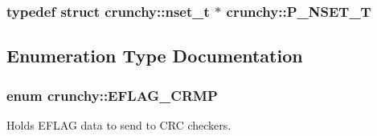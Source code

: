\subsubsection[{P\+\_\+\+N\+S\+E\+T\+\_\+T}]{\setlength{\rightskip}{0pt plus 5cm}typedef struct {\bf crunchy\+::nset\+\_\+t} $\ast$ {\bf crunchy\+::\+P\+\_\+\+N\+S\+E\+T\+\_\+T}}\hypertarget{namespacecrunchy_ab958409ccb75be47eba557824d83fb0e}{}\label{namespacecrunchy_ab958409ccb75be47eba557824d83fb0e}


\subsection{Enumeration Type Documentation}
\subsubsection[{E\+F\+L\+A\+G\+\_\+\+C\+R\+MP}]{\setlength{\rightskip}{0pt plus 5cm}enum {\bf crunchy\+::\+E\+F\+L\+A\+G\+\_\+\+C\+R\+MP}}\hypertarget{namespacecrunchy_acc00ed7986064df9b2232c76a22709c4}{}\label{namespacecrunchy_acc00ed7986064df9b2232c76a22709c4}


Holds E\+F\+L\+AG data to send to C\+RC checkers. 


